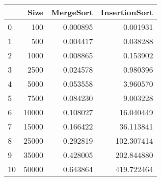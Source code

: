 \begin{tabular}{lrrr}
\toprule
{} &   Size &  MergeSort &  InsertionSort \\
\midrule
0  &    100 &   0.000895 &       0.001931 \\
1  &    500 &   0.004417 &       0.038288 \\
2  &   1000 &   0.008865 &       0.153902 \\
3  &   2500 &   0.024578 &       0.980396 \\
4  &   5000 &   0.053558 &       3.960570 \\
5  &   7500 &   0.084230 &       9.003228 \\
6  &  10000 &   0.108027 &      16.040449 \\
7  &  15000 &   0.166422 &      36.113841 \\
8  &  25000 &   0.292819 &     102.307414 \\
9  &  35000 &   0.428005 &     202.844880 \\
10 &  50000 &   0.643864 &     419.722464 \\
\bottomrule
\end{tabular}
